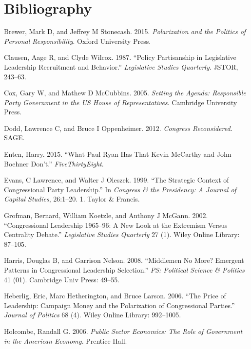 \documentclass[12pt,twoside]{reedthesis}
\begin{document}
  \backmatter
  
  \chapter{Bibliography}\label{bibliography}
  
  \noindent
  
  \setlength{\parindent}{-0.20in} \setlength{\leftskip}{0.20in}
  \setlength{\parskip}{8pt}
  
  Brewer, Mark D, and Jeffrey M Stonecash. 2015. \emph{Polarization and
  the Politics of Personal Responsibility}. Oxford University Press.
  
  Clausen, Aage R, and Clyde Wilcox. 1987. ``Policy Partisanship in
  Legislative Leadership Recruitment and Behavior.'' \emph{Legislative
  Studies Quarterly}. JSTOR, 243--63.
  
  Cox, Gary W, and Mathew D McCubbins. 2005. \emph{Setting the Agenda:
  Responsible Party Government in the US House of Representatives}.
  Cambridge University Press.
  
  Dodd, Lawrence C, and Bruce I Oppenheimer. 2012. \emph{Congress
  Reconsidered}. SAGE.
  
  Enten, Harry. 2015. ``What Paul Ryan Has That Kevin McCarthy and John
  Boehner Don't.'' \emph{FiveThirtyEight}.
  
  Evans, C Lawrence, and Walter J Oleszek. 1999. ``The Strategic Context
  of Congressional Party Leadership.'' In \emph{Congress \& the
  Presidency: A Journal of Capital Studies}, 26:1--20. 1. Taylor \&
  Francis.
  
  Grofman, Bernard, William Koetzle, and Anthony J McGann. 2002.
  ``Congressional Leadership 1965--96: A New Look at the Extremism Versus
  Centrality Debate.'' \emph{Legislative Studies Quarterly} 27 (1). Wiley
  Online Library: 87--105.
  
  Harris, Douglas B, and Garrison Nelson. 2008. ``Middlemen No More?
  Emergent Patterns in Congressional Leadership Selection.'' \emph{PS:
  Political Science \& Politics} 41 (01). Cambridge Univ Press: 49--55.
  
  Heberlig, Eric, Marc Hetherington, and Bruce Larson. 2006. ``The Price
  of Leadership: Campaign Money and the Polarization of Congressional
  Parties.'' \emph{Journal of Politics} 68 (4). Wiley Online Library:
  992--1005.
  
  Holcombe, Randall G. 2006. \emph{Public Sector Economics: The Role of
  Government in the American Economy}. Prentice Hall.
  
\end{document}
